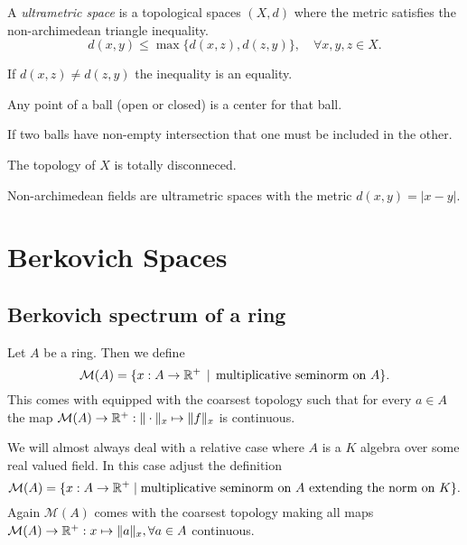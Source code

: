 \begin{definition}
	A \emph{ultrametric space} is a topological spaces $(X, d)$ where the metric satisfies the non-archimedean triangle inequality. 
	\[
		d(x, y) \le \max \{d(x, z) ,d(z, y)\}, \quad \forall x, y ,z \in X
	.\] 
\end{definition}
\begin{exericise}
	If $d(x,z) \ne d(z,y)$ the inequality is an equality. 
\end{exericise}
\begin{corollary}
	Any point of a ball (open or closed) is a center for that ball. 
\end{corollary}
\begin{corollary}
	If two balls have non-empty intersection that one must be included in the other. 
\end{corollary}
\begin{corollary}
	The topology of $X$ is totally disconneced. 
\end{corollary}

Non-archimedean fields are ultrametric spaces with the metric $d(x, y) = |x - y|$. 

\section{Berkovich Spaces} \label{sec:berkovich_spaces}

\subsection{Berkovich spectrum of a ring} \label{sec:berkovich_spectrum_of_a_ring}

\begin{definition}
	Let $A$ be a ring. Then we define \[
		\mathcal{M} (A) = \{x: A \to \R^{+} \st \text{multiplicative seminorm on } A\} 
	.\] 
	This comes with equipped with the coarsest topology such that for every $a \in A$ the map $\mathcal{M} (A) \to \mathbb{R}^{+}: \|\cdot \|_x \mapsto \|f\|_x $ is continuous. 

	We will almost always deal with a relative case where $A$ is a $K$ algebra over some real valued field. In this case adjust the definition \[
		\mathcal{M} (A) = \{x : A \to \mathbb{R}^{ + }  \mid \text{multiplicative seminorm on }A \text{ extending the norm on } K\} 
	.\] 
	Again $\mathcal{M} (A)$ comes with the coarsest topology making all maps $\mathcal{M} (A) \to \mathbb{R}^{+}: x \mapsto \|a\|_x, \forall a \in A$ continuous. 
\end{definition}

